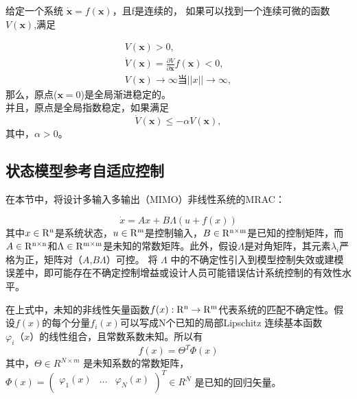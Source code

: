 \begin{thm}[全局稳定的李雅普诺夫分析]
给定一个系统 $\dot{\bm x} = f(\bm x)$，且f是连续的， 如果可以找到一个连续可微的函数$V(\bm x)$,满足

\begin{equation*}
    \begin{aligned}
        V(\bm x) > 0, \\
        \dot{V}(\bm x) = \frac{\partial V}{\partial {\bm x}}f(\bm x) < 0, \\
        V(\bm x) \rightarrow \infty \text{当} ||x||\rightarrow \infty,
    \end{aligned}
\end{equation*}
那么，原点($\bm x = 0$)是全局渐进稳定的。\\
并且，原点是全局指数稳定，如果满足
\begin{equation*}
\dot{V}(\bm x) \le -\alpha V(\bm x),
\end{equation*}
其中，$\alpha>0$。
\end{thm}






\subsection{状态模型参考自适应控制 }

在本节中，将设计多输入多输出（MIMO）非线性系统的MRAC：

\begin{equation}
 \dot{x}=Ax + B \Lambda (u + f(x))
\end{equation}
其中$x \in \rm{R}^n$是系统状态，$u \in \rm{R}^m$是控制输入，$B \in \rm{R}^{n \times m}$是已知的控制矩阵，而$A \in \rm{R}^{n \times n}$和$\Lambda \in \rm{R}^{m \times m}$是未知的常数矩阵。此外，假设$\Lambda$是对角矩阵，其元素$\lambda _i$严格为正，矩阵对（$A$,$B\Lambda$）可控。 将 $\Lambda$ 中的不确定性引入到模型控制失效或建模误差中，即可能存在不确定控制增益或设计人员可能错误估计系统控制的有效性水平。


在上式中，未知的非线性矢量函数$f(x):\rm{R}^n  \to  \rm{R}^m$代表系统的匹配不确定性。假设$f(x)$的每个分量$f_i(x)$可以写成N个已知的局部{Lipschitz} 连续基本函数 $\varphi _i（x）$的线性组合，且常数系数未知。所以有
\begin{equation}
f(x) = {{\Theta }^T}{\Phi }(x)
\end{equation}
其中，$\Theta \in R ^{N \times m}$ 是未知系数的常数矩阵，$\Phi (x) = {\left( {\begin{array}{*{20}{c}}
   {{\varphi _1}\left( x \right)} & {...} & {{\varphi _N}\left( x \right)}  \\
\end{array}} \right)^T} \in {R^N}$ 是已知的回归矢量。

